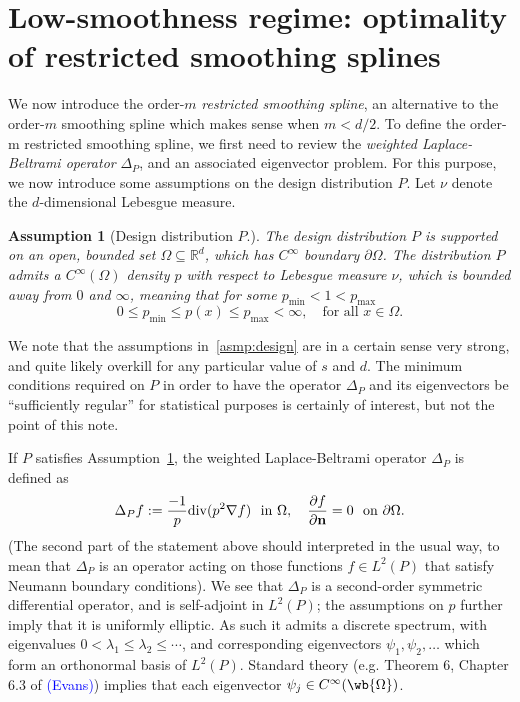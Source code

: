 \documentclass{article}
\newcommand{\Reals}{\mathbb{R}}
\newcommand{\1}{\mathbf{1}}
\newcommand{\Rd}{\Reals^d}
\theoremstyle{alden}
\theoremstyle{aldenthm}
\newtheorem{assumption}{Assumption}
\theoremstyle{definition}
\theoremstyle{remark}
\begin{document}
\section{Low-smoothness regime: optimality of restricted smoothing splines}
We now introduce the order-$m$ \emph{restricted smoothing spline}, an alternative to the order-$m$ smoothing spline which makes sense when $m < d/2$. To define the order-m restricted smoothing spline, we first need to review the \emph{weighted Laplace-Beltrami operator} $\Delta_P$, and an associated eigenvector problem. For this purpose, we now introduce some assumptions on the design distribution $P$. Let $\nu$ denote the $d$-dimensional Lebesgue measure.
\begin{assumption}[Design distribution $P$.]
	\label{asmp:design}
	The design distribution $P$ is supported on an open, bounded set $\Omega \subseteq \Rd$, which has $C^{\infty}$ boundary $\partial \Omega$. The distribution $P$ admits a $C^{\infty}(\Omega)$ density $p$ with respect to Lebesgue measure $\nu$, which is bounded away from $0$ and $\infty$, meaning that for some $p_{\min} < 1 < p_{\max}$
	\begin{equation*}
	0 \leq p_{\min} \leq p(x) \leq p_{\max} < \infty,\quad\textrm{for all $x \in \Omega$.}
	\end{equation*}
\end{assumption} 
We note that the assumptions in~\eqref{asmp:design} are in a certain sense very strong, and quite likely overkill for any particular value of $s$ and $d$. The minimum conditions required on $P$ in order to have the operator $\Delta_P$ and its eigenvectors be ``sufficiently regular'' for statistical purposes is certainly of interest, but not the point of this note. 

If $P$ satisfies Assumption~\ref{asmp:design}, the weighted Laplace-Beltrami operator $\Delta_P$ is defined as 
\begin{equation*}
\Delta_Pf := \frac{-1}{p} \mathrm{div}(p^2 \nabla f)~~\textrm{in $\Omega$}, \quad \frac{\partial f}{\partial {\bf n}} = 0~~\textrm{on $\partial \Omega$.}
\end{equation*}
(The second part of the statement above should interpreted in the usual way, to mean that $\Delta_P$ is an operator acting on those functions $f \in L^2(P)$ that satisfy Neumann boundary conditions). We see that $\Delta_P$ is a second-order symmetric differential operator, and is self-adjoint in $L^2(P)$; the assumptions on $p$ further imply that it is uniformly elliptic. As such it admits a discrete spectrum, with eigenvalues $0 < \lambda_1 \leq \lambda_2 \leq \cdots$, and corresponding eigenvectors $\psi_1,\psi_2,\ldots$ which form an orthonormal basis of $L^2(P)$. Standard theory (e.g. Theorem 6, Chapter 6.3 of \textcolor{blue}{(Evans)}) implies that each eigenvector $\psi_j \in C^{\infty}(\wb{\Omega})$. 
\end{document}
